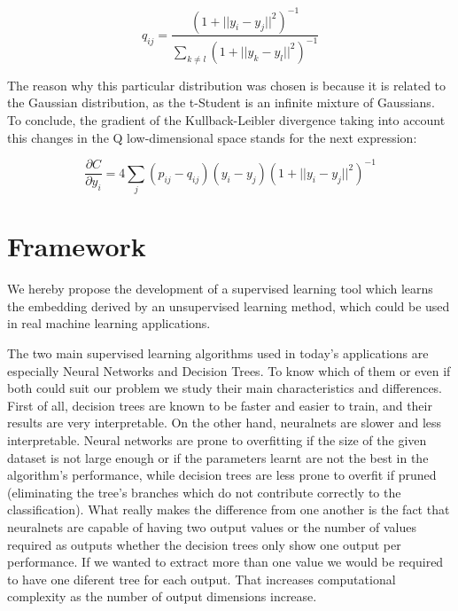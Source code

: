 \documentclass[a4paper,11pt,spanish]{report}
\begin{document}
$$ q_{ij} = \frac{(1+ ||y_{i}-y_{j}||^2)^{-1}} {\sum\limits_{k\neq l} (1+ ||y_{k}-y_{l}||^2)^{-1} }$$

The reason why this particular distribution was chosen is because it is related to the Gaussian distribution, as the t-Student is an infinite mixture of Gaussians.\\
To conclude, the gradient of the Kullback-Leibler divergence taking into account this changes in the Q low-dimensional space stands for the next expression:

$$ \frac{\partial C}{\partial y_{i}} = 4 \sum\limits_j (p_{ij} - q_{ij}) (y_{i} - y_{j}) (1+ ||y_{i}-y_{j}||^2)^{-1}$$



\chapter{Framework}
\label{chap:frame}

We hereby propose the development of a supervised learning tool which learns the embedding derived by an unsupervised learning method, which could be used in real machine learning applications.

The two main supervised learning algorithms used in today's applications are especially Neural Networks and Decision Trees. To know which of them or even if both could suit our problem we study their main characteristics and differences.\\
First of all, decision trees are known to be faster and easier to train, and their results are very interpretable. On the other hand, neuralnets are slower and less interpretable. Neural networks are prone to overfitting if the size of the given dataset is not large enough or if the parameters learnt are not the best in the algorithm's performance, while decision trees are less prone to overfit if pruned (eliminating the tree's branches which do not contribute  correctly to the classification). What really makes the difference from one another is the fact that neuralnets are capable of having two output values or the number of values required as outputs whether the decision trees only show one output per performance. If we wanted to extract more than one value we would be required to have one diferent tree for each output. That increases computational complexity as the number of output dimensions increase.
\end{document}
